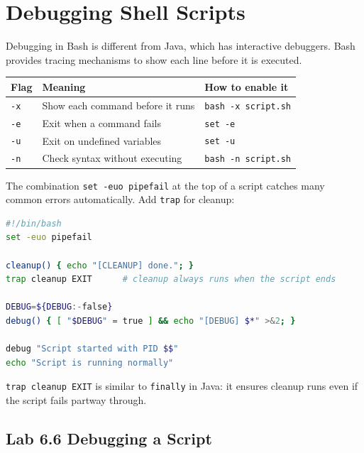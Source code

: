 \section{Debugging Shell Scripts}
\label{sec:debugging-script}

Debugging in Bash is different from Java, which has interactive debuggers.
Bash provides tracing mechanisms to show each line before it is executed.

\begin{center}
\begin{tabular}{lll}
\hline
\textbf{Flag} & \textbf{Meaning} & \textbf{How to enable it} \\
\hline
\texttt{-x} & Show each command before it runs & \texttt{bash -x script.sh} \\
\texttt{-e} & Exit when a command fails & \texttt{set -e} \\
\texttt{-u} & Exit on undefined variables & \texttt{set -u} \\
\texttt{-n} & Check syntax without executing & \texttt{bash -n script.sh} \\
\hline
\end{tabular}
\end{center}

The combination \texttt{set -euo pipefail} at the top of a script catches many
common errors automatically. Add \texttt{trap} for cleanup:

\begin{lstlisting}[language=bash, caption={Defensive script pattern}]
#!/bin/bash
set -euo pipefail

cleanup() { echo "[CLEANUP] done."; }
trap cleanup EXIT      # cleanup always runs when the script ends

DEBUG=${DEBUG:-false}
debug() { [ "$DEBUG" = true ] && echo "[DEBUG] $*" >&2; }

debug "Script started with PID $$"
echo "Script is running normally"
\end{lstlisting}

\begin{notebox}
\texttt{trap cleanup EXIT} is similar to \texttt{finally} in Java: it ensures
cleanup runs even if the script fails partway through.
\end{notebox}

\subsection*{Lab 6.6 Debugging a Script}

